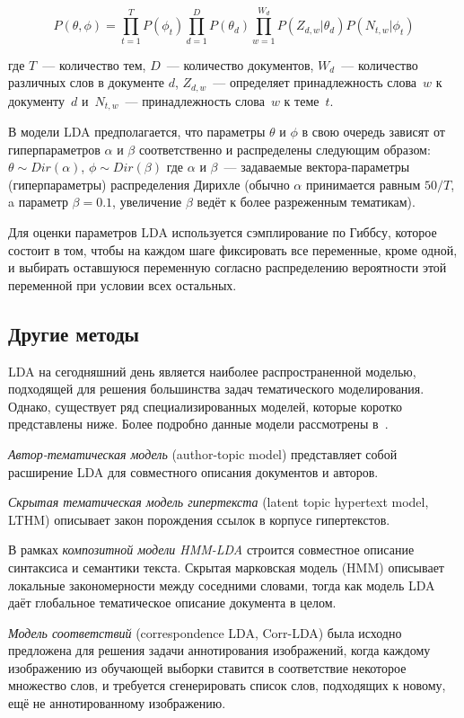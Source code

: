 \begin{equation}\label{eq:lda}
P(\theta, \phi)=\prod_{t=1}^{T}P(\phi_t)\prod_{d=1}^{D}P(\theta_d)\prod_{w=1}^{W_d}P(Z_{d,w}|\theta_d)P(N_{t,w}|\phi_t)
\end{equation}

\noindent
где $T$~--- количество тем, $D$~--- количество документов, $W_d$~--- количество различных слов в документе $d$, $Z_{d,w}$~--- определяет принадлежность слова~$w$ к документу~$d$ и~$N_{t,w}$~--- принадлежность слова~$w$ к теме~$t$.

В модели LDA предполагается, что параметры $\theta$ и $\phi$ в свою очередь зависят от гиперпараметров $\alpha$ и $\beta$ соответственно и распределены следующим образом:~$\theta\sim Dir(\alpha)$, $\phi\sim Dir(\beta)$ где $\alpha$ и $\beta$~--- задаваемые вектора-параметры (гиперпараметры) распределения Дирихле (обычно $\alpha$ принимается равным $50/T$, a параметр $\beta=0.1$, увеличение $\beta$ ведёт к более разреженным тематикам).

Для оценки параметров LDA используется сэмплирование по Гиббсу, которое состоит в том, чтобы на каждом шаге фиксировать все переменные, кроме одной, и выбирать оставшуюся переменную согласно распределению вероятности этой переменной при условии всех остальных.

\subsection{Другие методы}

LDA на сегодняшний день является наиболее распространенной моделью, подходящей для решения большинства задач тематического моделирования. Однако, существует ряд специализированных моделей, которые коротко представлены ниже. Более подробно данные модели рассмотрены в~\cite{TM}.

\textit{Автор-тематическая модель} (author-topic model) представляет собой расширение LDA для совместного описания документов и авторов.

\textit{Скрытая тематическая модель гипертекста} (latent topic hypertext model, LTHM) описывает закон порождения ссылок в корпусе гипертекстов.

В рамках \textit{композитной модели HMM-LDA} строится совместное описание синтаксиса и семантики текста. Скрытая марковская модель (HMM) описывает локальные закономерности между соседними словами, тогда как модель LDA даёт глобальное тематическое описание документа в целом.

\textit{Модель соответствий} (correspondence LDA, Corr-LDA) была исходно предложена для решения задачи аннотирования изображений, когда каждому изображению из обучающей выборки ставится в соответствие некоторое множество слов, и требуется сгенерировать список слов, подходящих к новому, ещё не аннотированному изображению.

